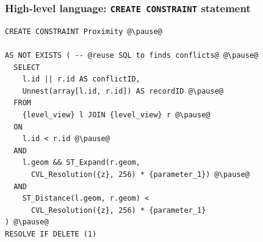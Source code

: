 \documentclass{beamer}
\begin{document}



\begin{frame}[fragile]
\frametitle{High-level language: \texttt{CREATE CONSTRAINT} statement}
\begin{lstlisting}[escapechar=@]
CREATE CONSTRAINT Proximity @\pause@

AS NOT EXISTS ( -- @reuse SQL to finds conflicts@ @\pause@
  SELECT  
    l.id || r.id AS conflictID, 
    Unnest(array[l.id, r.id]) AS recordID @\pause@
  FROM
    {level_view} l JOIN {level_view} r @\pause@
  ON
    l.id < r.id @\pause@
  AND
    l.geom && ST_Expand(r.geom, 
      CVL_Resolution({z}, 256) * {parameter_1}) @\pause@
  AND
    ST_Distance(l.geom, r.geom) < 
      CVL_Resolution({z}, 256) * {parameter_1} 
) @\pause@
RESOLVE IF DELETE (1)
\end{lstlisting}
\end{frame}


\end{document}
